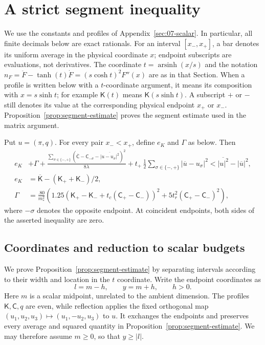 \section{A strict segment inequality}\label{sec:08-segments}

We use the constants and profiles of Appendix~\ref{sec:07-scalar}.
In particular, all finite decimals below are exact rationals. For an interval
$[x_-,x_+]$, a bar denotes its uniform average in the physical coordinate $x$;
endpoint subscripts are evaluations, not derivatives. The coordinate
$t=\operatorname{arsinh}(x/s)$ and the notation
$n_F=\ddot F-\tanh(t)\dot F=(s\cosh t)^2F''(x)$ are as in that Section.
When a profile is written below with a $t$-coordinate argument, it
means its composition with $x=s\sinh t$; for example $\mathsf K(t)$
means $\mathsf K(s\sinh t)$. A subscript $+$ or $-$ still denotes
its value at the corresponding physical endpoint $x_+$ or $x_-$.
Proposition~\ref{prop:segment-estimate} proves the segment estimate used in the matrix
argument.

\begin{proposition}\label{prop:segment-estimate}
Put $u=(\pi,q)$. For every pair $x_-<x_+$, define $e_K$ and $\Gamma$ as below.
Then
\[
\begin{aligned}
 e_K&+\Gamma+
 \frac{\sum_{\sigma\in\{-,+\}}(\overline{\mathsf C}-\mathsf C_{-\sigma}
                     -\overline{|u-u_\sigma|^2})^2}{8\lambda}
 +t_+\,\frac12\sum_{\sigma\in\{-,+\}}|\overline u-u_\sigma|^2
 < \overline{|u|^2}-|\overline u|^2,\\
 e_K&=\overline{\mathsf K}-(\mathsf K_++\mathsf K_-)/2,\\
 \Gamma&=\frac{.80}{m_*^2}
 \left(1.25(\mathsf K_+-\mathsf K_-+t_c(\mathsf C_+-\mathsf C_-))^2+
             5t_r^2(\mathsf C_+-\mathsf C_-)^2\right),
\end{aligned}
\]
where $-\sigma$ denotes the opposite endpoint. At coincident endpoints,
both sides of the asserted inequality are zero.
\end{proposition}

\subsection{Coordinates and reduction to scalar budgets}
\label{subsec:segments-reduction}

We prove Proposition~\ref{prop:segment-estimate} by separating intervals according to their width
and location in the $t$ coordinate. Write the endpoint coordinates as
\[
 l=m-h,\qquad y=m+h,\qquad h>0.
\]
Here $m$ is a scalar midpoint, unrelated to the ambient dimension.
The profiles $\mathsf K,\mathsf C,q$ are even, while reflection applies
the fixed orthogonal map $(u_1,u_2,u_3)\mapsto(u_1,-u_2,u_3)$ to $u$.
It exchanges the endpoints and preserves every average and squared
quantity in Proposition~\ref{prop:segment-estimate}. We may therefore assume $m\ge0$, so that
$y\ge|l|$.

